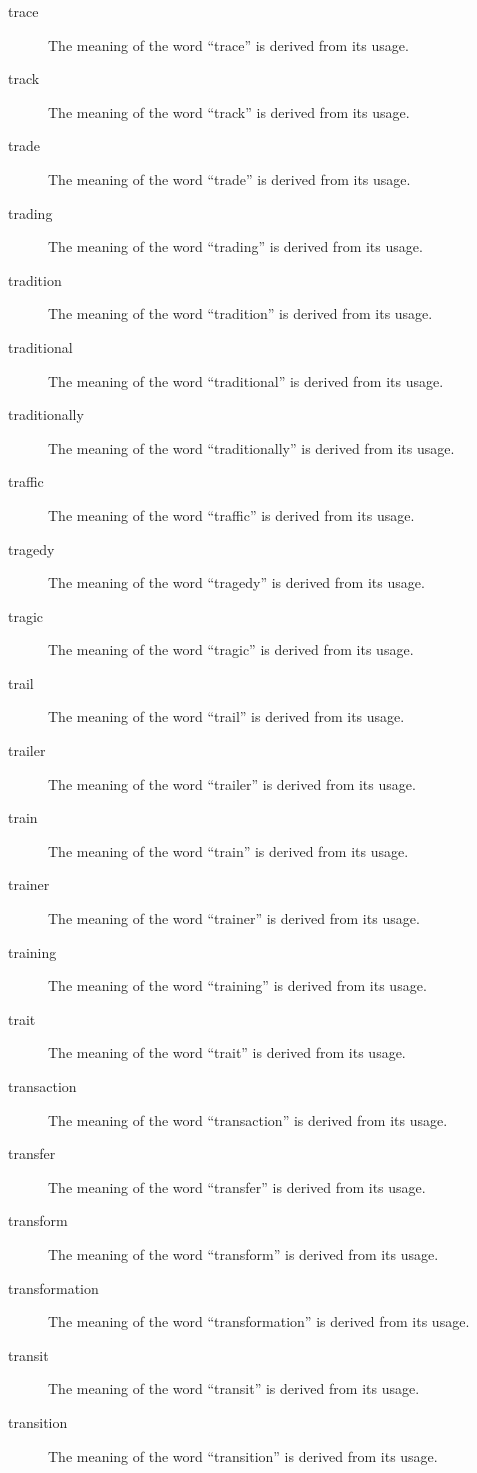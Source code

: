 \documentclass[12pt, letterpaper]{memoir}
\begin{document}
\begin{description}
\item[trace] The meaning of the word ``trace'' is derived from its usage.
\item[track] The meaning of the word ``track'' is derived from its usage.
\item[trade] The meaning of the word ``trade'' is derived from its usage.
\item[trading] The meaning of the word ``trading'' is derived from its usage.
\item[tradition] The meaning of the word ``tradition'' is derived from its usage.
\item[traditional] The meaning of the word ``traditional'' is derived from its usage.
\item[traditionally] The meaning of the word ``traditionally'' is derived from its usage.
\item[traffic] The meaning of the word ``traffic'' is derived from its usage.
\item[tragedy] The meaning of the word ``tragedy'' is derived from its usage.
\item[tragic] The meaning of the word ``tragic'' is derived from its usage.
\item[trail] The meaning of the word ``trail'' is derived from its usage.
\item[trailer] The meaning of the word ``trailer'' is derived from its usage.
\item[train] The meaning of the word ``train'' is derived from its usage.
\item[trainer] The meaning of the word ``trainer'' is derived from its usage.
\item[training] The meaning of the word ``training'' is derived from its usage.
\item[trait] The meaning of the word ``trait'' is derived from its usage.
\item[transaction] The meaning of the word ``transaction'' is derived from its usage.
\item[transfer] The meaning of the word ``transfer'' is derived from its usage.
\item[transform] The meaning of the word ``transform'' is derived from its usage.
\item[transformation] The meaning of the word ``transformation'' is derived from its usage.
\item[transit] The meaning of the word ``transit'' is derived from its usage.
\item[transition] The meaning of the word ``transition'' is derived from its usage.

\end{description}
\end{document}
